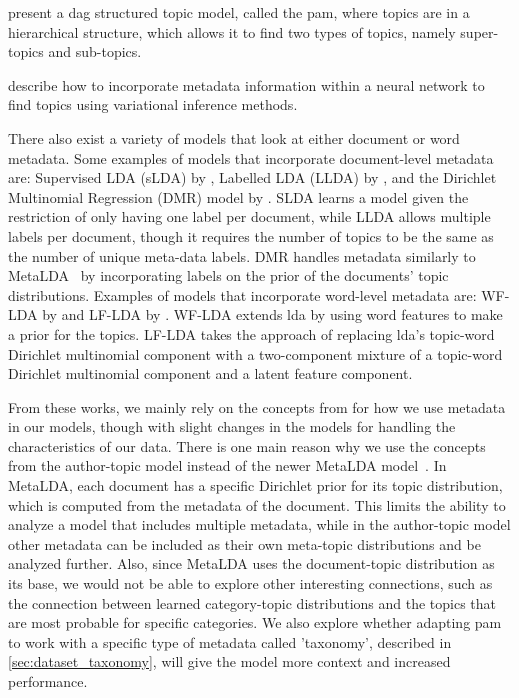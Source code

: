 \citet{li2006pachinko} present a \gls{dag} structured topic model, called the \gls{pam}, where topics are in a hierarchical structure, which allows it to find two types of topics, namely super-topics and sub-topics.  

\citet{card2017neural} describe how to incorporate metadata information within a neural network to find topics using variational inference methods.

There also exist a variety of models that look at either document or word metadata.
Some examples of models that incorporate document-level metadata are: Supervised LDA (sLDA) by \citet{blei2010supervised}, Labelled LDA (LLDA) by \citet{llda2009}, and the Dirichlet Multinomial Regression (DMR) model by \citet{mimno2008topic}.
SLDA learns a model given the restriction of only having one label per document, while LLDA allows multiple labels per document, though it requires the number of topics to be the same as the number of unique meta-data labels.
DMR handles metadata similarly to MetaLDA~\cite{MetaLDA2017} by incorporating labels on the prior of the documents' topic distributions.
Examples of models that incorporate word-level metadata are: WF-LDA by \citet{wf-lda2010} and LF-LDA by \citet{lf-lda2015}.
WF-LDA extends \gls{lda} by using word features to make a prior for the topics.
LF-LDA takes the approach of replacing \gls{lda}'s topic-word Dirichlet multinomial component with a two-component mixture of a topic-word Dirichlet multinomial component and a latent feature component.

From these works, we mainly rely on the concepts from \citet{author_topic_2012} for how we use metadata in our models, though with slight changes in the models for handling the characteristics of our data.
There is one main reason why we use the concepts from the author-topic model instead of the newer MetaLDA model~\cite{MetaLDA2017}.
In MetaLDA, each document has a specific Dirichlet prior for its topic distribution, which is computed from the metadata of the document.
This limits the ability to analyze a model that includes multiple metadata, while in the author-topic model other metadata can be included as their own meta-topic distributions and be analyzed further.
Also, since MetaLDA uses the document-topic distribution as its base, we would not be able to explore other interesting connections, such as the connection between learned category-topic distributions and the topics that are most probable for specific categories.
We also explore whether adapting \gls{pam}~\cite{li2006pachinko} to work with a specific type of metadata called 'taxonomy', described in \autoref{sec:dataset_taxonomy}, will give the model more context and increased performance.

